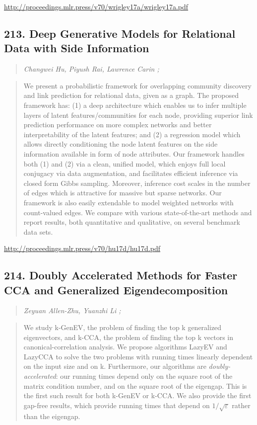 \documentclass{article}
\begin{document}
\href{http://proceedings.mlr.press/v70/wrigley17a/wrigley17a.pdf}{http://proceedings.mlr.press/v70/wrigley17a/wrigley17a.pdf}

\subsection{213. Deep Generative Models for Relational Data with Side Information}

\begin{quote}
\footnotesize{\textit{Changwei Hu, Piyush Rai, Lawrence Carin ;}}
\end{quote}

\begin{quote}
    We present a probabilistic framework for overlapping community discovery and link prediction for relational data, given as a graph. The proposed framework has: (1) a deep architecture which enables us to infer multiple layers of latent features/communities for each node, providing superior link prediction performance on more complex networks and better interpretability of the latent features; and (2) a regression model which allows directly conditioning the node latent features on the side information available in form of node attributes. Our framework handles both (1) and (2) via a clean, unified model, which enjoys full local conjugacy via data augmentation, and facilitates efficient inference via closed form Gibbs sampling. Moreover, inference cost scales in the number of edges which is attractive for massive but sparse networks. Our framework is also easily extendable to model weighted networks with count-valued edges. We compare with various state-of-the-art methods and report results, both quantitative and qualitative, on several benchmark data sets.  \end{quote}

\href{http://proceedings.mlr.press/v70/hu17d/hu17d.pdf}{http://proceedings.mlr.press/v70/hu17d/hu17d.pdf}

\subsection{214. Doubly Accelerated Methods for Faster CCA and Generalized Eigendecomposition}

\begin{quote}
\footnotesize{\textit{Zeyuan Allen-Zhu, Yuanzhi Li ;}}
\end{quote}

\begin{quote}
    We study k-GenEV, the problem of finding the top k generalized eigenvectors, and k-CCA, the problem of finding the top k vectors in canonical-correlation analysis. We propose algorithms LazyEV and LazyCCA to solve the two problems with running times linearly dependent on the input size and on k. Furthermore, our algorithms are \textit{doubly-accelerated}: our running times depend only on the square root of the matrix condition number, and on the square root of the eigengap. This is the first such result for both k-GenEV or k-CCA. We also provide the first gap-free results, which provide running times that depend on $1/\sqrt{\varepsilon}$ rather than the eigengap.  \end{quote}
\end{document}
